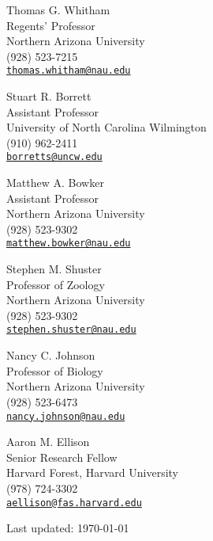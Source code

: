 \documentclass[letterpaper]{article}
\renewenvironment{itemize}{
  \begin{list}{}{
    \setlength{\leftmargin}{1em}
  }
}{
  \end{list}
}
\begin{document}
\begin{minipage}[t]{0.5\textwidth}
\begin{itemize}
\item Thomas G. Whitham \\ Regents' Professor \\ Northern Arizona University \\
  (928) 523-7215 \\
  \href{mailto:thomas.whitham@nau.edu}{\texttt {thomas.whitham@nau.edu}}
\item Stuart R. Borrett \\ Assistant Professor \\ University of North
  Carolina Wilmington\\
  (910) 962-2411 \\
  \href{mailto:borretts@uncw.edu}{\tt borretts@uncw.edu}
\item Matthew A. Bowker \\ Assistant Professor \\ Northern Arizona University \\
  (928) 523-9302 \\
  \href{mailto:matthew.bowker@nau.edu}{\tt matthew.bowker@nau.edu}

\end{itemize}
\end{minipage}
\begin{minipage}[t]{0.5\textwidth}
\begin{itemize}
\item Stephen M. Shuster \\ Professor of Zoology \\ Northern Arizona University \\
  (928) 523-9302 \\
  \href{mailto:stephen.shuster@nau.edu}{\tt stephen.shuster@nau.edu}
\item Nancy C. Johnson \\ Professor of Biology \\ Northern Arizona University \\
  (928) 523-6473 \\
  \href{mailto:nancy.johnson@nau.edu}{\tt nancy.johnson@nau.edu}
\item Aaron M. Ellison \\ Senior Research Fellow \\ Harvard Forest, Harvard University \\
  (978) 724-3302 \\
  \href{mailto:aellison@fas.harvard.edu}{\tt aellison@fas.harvard.edu}
\end{itemize}
\end{minipage}


\bigskip

\begin{center}
\begin{footnotesize}
Last updated: \today \\
\end{footnotesize}
\end{center}
\end{document}
